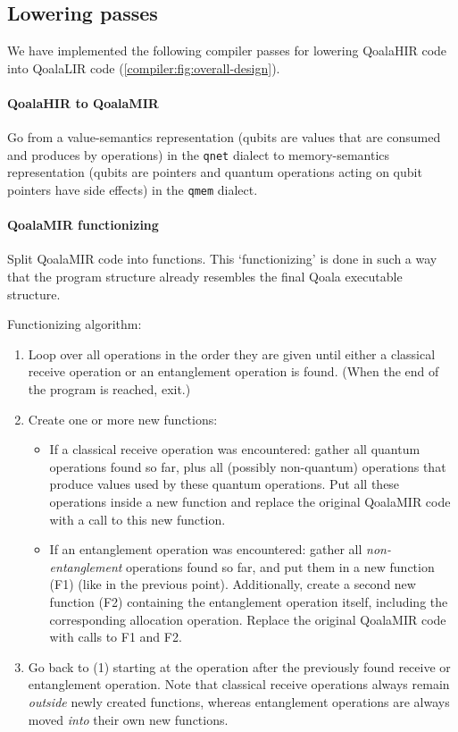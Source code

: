 \subsection{Lowering passes}
We have implemented the following compiler passes for lowering QoalaHIR code into QoalaLIR code (\cref{compiler:fig:overall-design}).

\paragraph{QoalaHIR to QoalaMIR}
Go from a value-semantics representation (qubits are values that are consumed and produces by operations) in the \texttt{qnet} dialect to memory-semantics representation (qubits are pointers and quantum operations acting on qubit pointers have side effects) in the \texttt{qmem} dialect.

\paragraph{QoalaMIR functionizing}
Split QoalaMIR code into functions.
This `functionizing' is done in such a way that the program structure already resembles the final Qoala executable structure.

Functionizing algorithm:
\begin{enumerate}
\item Loop over all operations in the order they are given until either a classical receive operation or an entanglement operation is found. (When the end of the program is reached, exit.)
\item Create one or more new functions:
    \begin{itemize}
        \item If a classical receive operation was encountered: gather all quantum operations found so far, plus all (possibly non-quantum) operations that produce values used by these quantum operations.
        Put all these operations inside a new function and replace the original QoalaMIR code with a call to this new function.
        \item If an entanglement operation was encountered: gather all \emph{non-entanglement} operations found so far, and put them in a new function (F1) (like in the previous point).
        Additionally, create a second new function (F2) containing the entanglement operation itself, including the corresponding allocation operation. Replace the original QoalaMIR code with calls to F1 and F2.
    \end{itemize}
\item Go back to (1) starting at the operation after the previously found receive or entanglement operation. Note that classical receive operations always remain \emph{outside} newly created functions, whereas entanglement operations are always moved \emph{into} their own new functions.
\end{enumerate}

